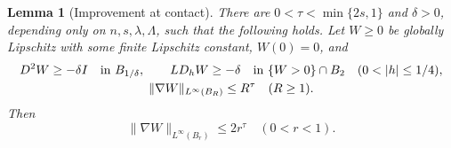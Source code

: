 \documentclass[11pt]{article}
\numberwithin{equation}{section}
\newtheorem{lemma}[theorem]{Lemma}
\theoremstyle{remark}
\newcommand{\norm}[1]{\lVert #1\rVert}
\newcommand{\abs}[1]{\lvert #1\rvert}
\begin{document}
\begin{lemma}[Improvement at contact]\label{lem:contactimprove}
There are $0<\tau<\min\{2s,1\}$ and $\delta>0$, depending only on $n,s,\lambda,\Lambda$, such that the following holds. Let $W\ge0$ be globally Lipschitz with some finite Lipschitz constant, $W(0)=0$, and
\begin{gather}\label{eq:improvehyp}
 D^2W\ge-\delta I\quad\hbox{in }B_{1/\delta},\qquad
 LD_hW\ge-\delta\quad\hbox{in }\{W>0\}\cap B_2\quad(0<\abs h\le1/4),\\
 \norm{\nabla W}_{L^\infty(B_R)}\le R^\tau\quad(R\ge1).\notag
\end{gather}
Then
\begin{equation}\label{eq:contactimprove}
 \norm{\nabla W}_{L^\infty(B_r)}\le2r^\tau\quad(0<r<1).
\end{equation}
\end{lemma}
\end{document}
